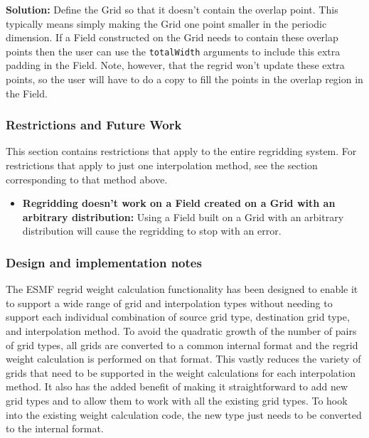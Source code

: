  \smallskip

 {\bf Solution:} Define the Grid so that it doesn't contain the overlap point. This typically means simply making
 the Grid one point smaller in the periodic dimension.  If a Field 
 constructed on the Grid needs to contain these overlap points then the user can use the
 {\tt totalWidth} arguments to include this extra padding in the Field. Note, however, 
 that the regrid won't update these extra points, so the user will have to do a copy to fill the points
 in the overlap region in the Field.  

\subsubsection{Restrictions and Future Work}
This section contains restrictions that apply to the entire regridding system. For restrictions that apply to just one interpolation method, see the section corresponding to that method above.

\begin{itemize}

\item {\bf Regridding doesn't work on a Field created on a Grid with an arbitrary distribution:} Using a Field built on a Grid with an arbitrary distribution will cause the regridding to stop with an error.  

\end{itemize}

\subsubsection{Design and implementation notes}

The ESMF regrid weight calculation functionality has been designed to enable it to support a wide range
of grid and interpolation types without needing to support each individual combination of source grid type,
destination grid type, and interpolation method. To avoid the quadratic growth of the number of pairs
of grid types, all grids are converted to a common internal format and the regrid weight calculation
is performed on that format. This vastly reduces the variety of grids that need to be supported in 
the weight calculations for each interpolation method. It also has the added benefit of making it
straightforward to add new grid types and to allow them to work with all the existing grid types.
To hook into the existing weight calculation code, the new type just needs to be converted to the
internal format. 

